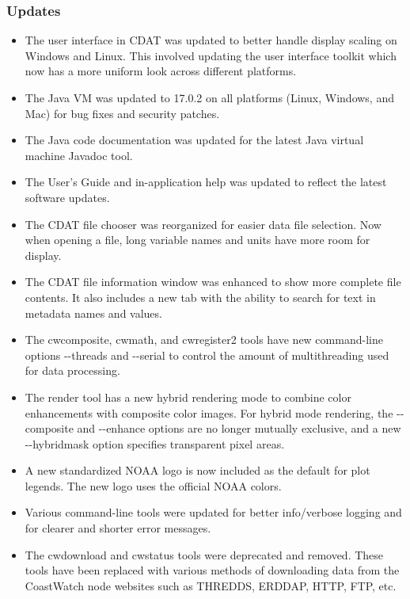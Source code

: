 \subsubsection*{ Updates}

\begin{itemize}
  
  \item The user interface in CDAT was updated to better handle display 
  scaling on Windows and Linux.  This involved updating the user interface
  toolkit which now has a more uniform look across different platforms.

  \item The Java VM was updated to 17.0.2 on all platforms (Linux, Windows,
  and Mac) for bug fixes and security patches.

  \item The Java code documentation was updated for the latest Java 
  virtual machine Javadoc tool.

  \item The User's Guide and in-application help was updated to reflect the 
  latest software updates.

  \item The CDAT file chooser was reorganized for easier data file selection.
  Now when opening a file, long variable names and units have more room for 
  display.

  \item The CDAT file information window was enhanced to show more complete
  file contents.  It also includes a new tab with the ability to search for text
  in metadata names and values.

  \item The cwcomposite, cwmath, and cwregister2 tools have new command-line
  options -{-}threads and -{-}serial to control the amount of multithreading
  used for data processing.

  \item The render tool has a new hybrid rendering mode to combine color
  enhancements with composite color images.  For hybrid mode rendering, 
  the -{-}composite and -{-}enhance options are no longer mutually exclusive, 
  and a new -{-}hybridmask option specifies transparent pixel areas.

  \item A new standardized NOAA logo is now included as the default
  for plot legends.  The new logo uses the official NOAA colors.

  \item Various command-line tools were updated for better info/verbose logging
  and for clearer and shorter error messages.

  \item The cwdownload and cwstatus tools were deprecated and removed.
  These tools have been replaced with various methods of downloading
  data from the CoastWatch node websites such as THREDDS, ERDDAP, HTTP, FTP,
  etc.

\end{itemize}

